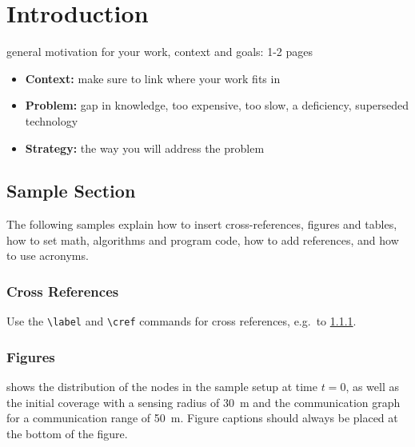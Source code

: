 \chapter{Introduction}
\label{sec:introduction}

general motivation for your work, context and goals: 1-2 pages

\begin{itemize}
\item \textbf{Context:} make sure to link where your work fits in
\item \textbf{Problem:} gap in knowledge, too expensive, too slow, a deficiency, superseded technology
\item \textbf{Strategy:} the way you will address the problem 
\end{itemize}


\section{Sample Section}

The following samples explain how to insert cross-references, figures and tables, how to set math, algorithms and program code, how to add references, and how to use acronyms.


\subsection{Cross References}
\label{sec:cross-ref}

Use the \verb|\label| and \verb|\cref| commands for cross references, e.g.\ to \cref{sec:cross-ref}. 

\subsection{Figures}

 shows the distribution of the nodes in the sample setup at time $t=0$, as well as the initial coverage with a sensing radius of \SI{30}{\metre} and the communication graph for a communication range of \SI{50}{\metre}.
Figure captions should always be placed at the bottom of the figure.

